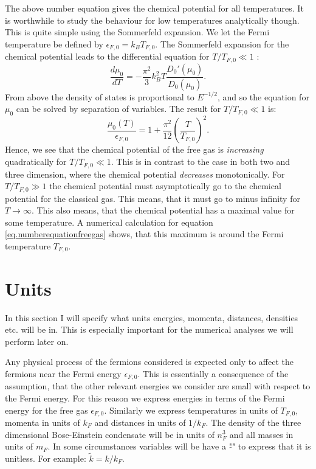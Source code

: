 The above number equation gives the chemical potential for all temperatures. It is worthwhile to study the behaviour for low temperatures analytically though. This is quite simple using the Sommerfeld expansion. We let the Fermi temperature be defined by $\epsilon_{F,0} = k_B T_{F,0}$. The Sommerfeld expansion for the chemical potential leads to the differential equation for $T/T_{F,0} \ll 1$ \cite{GiuseppeGiuseppe}:
\begin{equation}
\frac{d\mu_0}{dT} = -\frac{\pi^2}{3}k_B^2 T \frac{D_0'(\mu_0)}{D_0(\mu_0)}. \nonumber
\end{equation}
From above the density of states is proportional to $E^{-1/2}$, and so the equation for $\mu_0$ can be solved by separation of variables. The result for $T/T_{F,0}\ll 1$ is:
\begin{equation}
\frac{\mu_0(T)}{\epsilon_{F,0}} = 1 + \frac{\pi^2}{12}\left(\frac{T}{T_{F,0}}\right)^2.
\end{equation}
Hence, we see that the chemical potential of the free gas is \textit{increasing} quadratically for $T/T_{F,0} \ll 1$. This is in contrast to the case in both two and three dimension, where the chemical potential \textit{decreases} monotonically. For $T/T_{F,0} \gg 1$ the chemical potential must asymptotically go to the chemical potential for the classical gas. This means, that it must go to minus infinity for $T\to \infty$.\cite{SchroederThermal} This also means, that the chemical potential has a maximal value for some temperature. A numerical calculation for equation \eqref{eq.numberequationfreegas} shows, that this maximum is around the Fermi temperature $T_{F,0}$. 

\section{Units}
In this section I will specify what units energies, momenta, distances, densities etc. will be in. This is especially important for the numerical analyses we will perform later on. 

Any physical process of the fermions considered is expected only to affect the fermions near the Fermi energy $\epsilon_{F,0}$. This is essentially a consequence of the assumption, that the other relevant energies we consider are small with respect to the Fermi energy. For this reason we express energies in terms of the Fermi energy for the free gas $\epsilon_{F,0}$. Similarly we express temperatures in units of $T_{F,0}$, momenta in units of $k_F$ and distances in units of $1/k_F$. The density of the three dimensional Bose-Einstein condensate will be in units of $n_F^3$ and all masses in units of $m_F$. In some circumstances variables will be have a "$\tilde{}$" to express that it is unitless. For example: $\tilde{k} = k/k_F$.  

